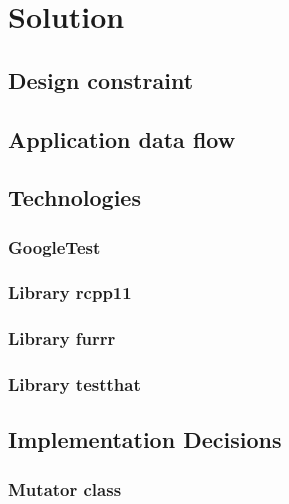 \chapter{Solution}

\begin{chapterabstract}
\end{chapterabstract}

\section{Design constraint}

\section{Application data flow}


\section{Technologies}

\subsection{GoogleTest}

\subsection{Library rcpp11}

\subsection{Library furrr}

\subsection{Library testthat}

\section{Implementation Decisions}

\subsection{Mutator class}

